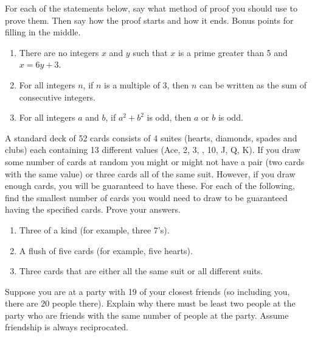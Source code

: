 \documentclass[10pt,]{book}
\theoremstyle{plain}
\theoremstyle{definition}
\theoremstyle{definition}
\theoremstyle{definition}
\theoremstyle{definition}
\numberwithin{equation}{chapter}
\begin{document}
\begin{divisionexercise}{15}\hypertarget{exercise-250}{}
\hypertarget{p-2069}{}%
For each of the statements below, say what method of proof you should use to prove them. Then say how the proof starts and how it ends. Bonus points for filling in the middle.%
\par
\hypertarget{p-2070}{}%
\leavevmode%
\begin{enumerate}[label=(\alph*)]
\item\hypertarget{li-714}{}\hypertarget{p-2071}{}%
There are no integers \(x\) and \(y\) such that \(x\) is a prime greater than 5 and \(x = 6y + 3\).%
\item\hypertarget{li-715}{}\hypertarget{p-2072}{}%
For all integers \(n\), if \(n\) is a multiple of 3, then \(n\) can be written as the sum of consecutive integers.%
\item\hypertarget{li-716}{}\hypertarget{p-2073}{}%
For all integers \(a\) and \(b\), if \(a^2 + b^2\) is odd, then \(a\) or \(b\) is odd.%
\end{enumerate}
%
\end{divisionexercise}%
\begin{divisionexercise}{16}\hypertarget{exercise-251}{}
\hypertarget{p-2078}{}%
A standard deck of 52 cards consists of 4 suites (hearts, diamonds, spades and clubs) each containing 13 different values (Ace, 2, 3, \textellipsis{}, 10, J, Q, K). If you draw some number of cards at random you might or might not have a pair (two cards with the same value) or three cards all of the same suit. However, if you draw enough cards, you will be guaranteed to have these. For each of the following, find the smallest number of cards you would need to draw to be guaranteed having the specified cards. Prove your answers.%
\par
\hypertarget{p-2079}{}%
\leavevmode%
\begin{enumerate}[label=(\alph*)]
\item\hypertarget{li-720}{}\hypertarget{p-2080}{}%
Three of a kind (for example, three 7's). %
\item\hypertarget{li-721}{}\hypertarget{p-2081}{}%
A flush of five cards (for example, five hearts). %
\item\hypertarget{li-722}{}\hypertarget{p-2082}{}%
Three cards that are either all the same suit or all different suits. %
\end{enumerate}
%
\end{divisionexercise}%
\begin{divisionexercise}{17}\hypertarget{exercise-252}{}
\hypertarget{p-2083}{}%
Suppose you are at a party with 19 of your closest friends (so including you, there are 20 people there). Explain why there must be least two people at the party who are friends with the same number of people at the party. Assume friendship is always reciprocated.%
\end{divisionexercise}%
\end{document}
